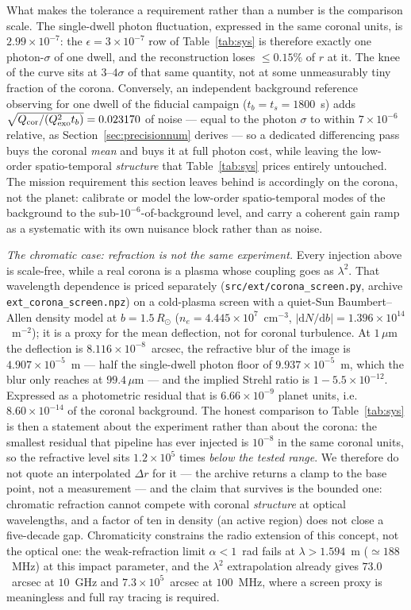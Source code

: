 \documentclass[twocolumn,10pt]{article}
\begin{document}
What makes the tolerance a requirement rather than a number is the comparison
scale. The single-dwell photon fluctuation, expressed in the same coronal units,
is $2.99\times10^{-7}$: the $\epsilon=3\times10^{-7}$ row of Table~\ref{tab:sys}
is therefore exactly one photon-$\sigma$ of one dwell, and the reconstruction
loses $\le0.15\%$ of $r$ at it. The knee of the curve sits at $3$--$4\sigma$ of
that same quantity, not at some unmeasurably tiny fraction of the corona.
Conversely, an independent background reference observing for one dwell of the
fiducial campaign ($t_b=t_s=1800$~s) adds
$\sqrt{Q_{\rm cor}/(Q_{\rm exo}^{2}t_b)}=0.023170$ of noise --- equal to the photon
$\sigma$ to within $7\times10^{-6}$ relative, as Section~\ref{sec:precisionnum}
derives --- so a dedicated differencing pass buys the coronal \emph{mean} and
buys it at full photon cost, while leaving the low-order spatio-temporal
\emph{structure} that Table~\ref{tab:sys} prices entirely untouched. The
mission requirement this section leaves behind is accordingly on the corona, not
the planet: calibrate or model the low-order spatio-temporal modes of the
background to the sub-$10^{-6}$-of-background level, and carry a coherent gain
ramp as a systematic with its own nuisance block rather than as noise.

\emph{The chromatic case: refraction is not the same experiment.} Every
injection above is scale-free, while a real corona is a plasma whose coupling
goes as $\lambda^2$. That wavelength dependence is priced separately
({\tt src/ext/corona\_screen.py}, archive {\tt ext\_corona\_screen.npz}) on a
cold-plasma screen with a quiet-Sun Baumbert--Allen density model at
$b=1.5\,R_\odot$ ($n_e=4.445\times10^{7}$~cm$^{-3}$,
$|\mathrm{d}N/\mathrm{d}b|=1.396\times10^{14}$~m$^{-2}$); it is a proxy for the
mean deflection, not for coronal turbulence. At $1\,\mu$m the deflection is
$8.116\times10^{-8}$~arcsec, the refractive blur of the image is
$4.907\times10^{-5}$~m --- half the single-dwell photon floor of
$9.937\times10^{-5}$~m, which the blur only reaches at $99.4\,\mu$m --- and the
implied Strehl ratio is $1-5.5\times10^{-12}$. Expressed as a photometric
residual that is $6.66\times10^{-9}$ planet units, i.e.\ $8.60\times10^{-14}$
of the coronal background. The honest comparison to Table~\ref{tab:sys} is then
a statement about the experiment rather than about the corona: the smallest
residual that pipeline has ever injected is $10^{-8}$ in the same coronal
units, so the refractive level sits $1.2\times10^{5}$ times \emph{below the
tested range}. We therefore do not quote an interpolated $\Delta r$ for it ---
the archive returns a clamp to the base point, not a measurement --- and the
claim that survives is the bounded one: chromatic refraction cannot compete
with coronal \emph{structure} at optical wavelengths, and a factor of ten in
density (an active region) does not close a five-decade gap. Chromaticity
constrains the radio extension of this concept, not the optical one: the
weak-refraction limit $\alpha<1$~rad fails at $\lambda>1.594$~m ($\simeq188$~MHz)
at this impact parameter, and the $\lambda^2$ extrapolation already gives
$73.0$~arcsec at $10$~GHz and $7.3\times10^{5}$~arcsec at $100$~MHz, where a
screen proxy is meaningless and full ray tracing is required.
\end{document}
